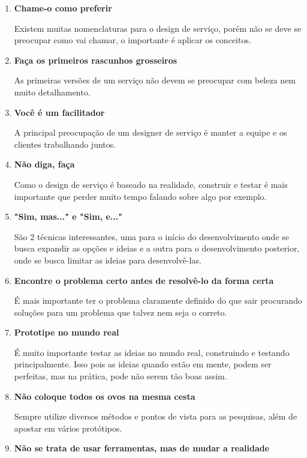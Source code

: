 \begin{enumerate}
	\item \textbf{Chame-o como preferir}
	
	Existem muitas nomenclaturas para o design de serviço, porém não se deve se preocupar como vai chamar, o importante é aplicar os conceitos.
	
	\item \textbf{Faça os primeiros rascunhos grosseiros}
	
	As primeiras versões de um serviço não devem se preocupar com beleza nem muito detalhamento.
	
	\item \textbf{Você é um facilitador}
	
	A principal preocupação de um designer de serviço é manter a equipe e os clientes trabalhando juntos.
	
	\item \textbf{Não diga, faça}
	
	Como o design de serviço é baseado na realidade, construir e testar é mais importante que perder muito tempo falando sobre algo por exemplo.
	
	\item \textbf{"Sim, mas..." e "Sim, e..."}
	
	São 2 técnicas interessantes, uma para o início do desenvolvimento onde se busca expandir as opções e ideias e a outra para o desenvolvimento posterior, onde se busca limitar as ideias para desenvolvê-las.
	
	\item \textbf{Encontre o problema certo antes de resolvê-lo da forma certa}
	
	É mais importante ter o problema claramente definido do que sair procurando soluções para um problema que talvez nem seja o correto.
	
	\item \textbf{Prototipe no mundo real}
	
 	É muito importante testar as ideias no mundo real, construindo e testando principalmente. Isso pois as ideias quando estão em mente, podem ser perfeitas, mas na prática, pode não serem tão boas assim.
	
	\item \textbf{Não coloque todos os ovos na mesma cesta}
	
	Sempre utilize diversos métodos e pontos de vista para as pesquisas, além de apostar em vários protótipos.
	
	\item \textbf{Não se trata de usar ferramentas, mas de mudar a realidade}
	

\end{enumerate}
